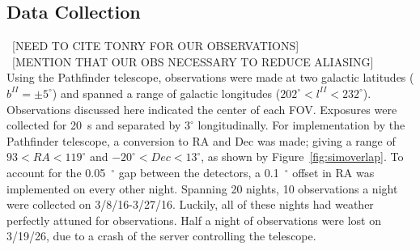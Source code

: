 \documentclass[aps,prb,twocolumn,superscriptaddress]{revtex4-1}
\begin{document}
\subsection{Data Collection}\label{sec:data}

~[NEED TO CITE TONRY FOR OUR OBSERVATIONS]\\
~[MENTION THAT OUR OBS NECESSARY TO REDUCE ALIASING]\\

Using the Pathfinder telescope, observations were made at two galactic latitudes ($b^{II}=\pm5^{\circ}$) and spanned a range of galactic longitudes ($202^{\circ} < l^{II} < 232^{\circ}$).  Observations discussed here indicated the center of each FOV.  
Exposures were collected for 20~s and separated by $3^{\circ}$ longitudinally.  For implementation by the Pathfinder telescope, a conversion to RA and Dec was made; giving a range of $93 < RA < 119^{\circ}$ and $-20^{\circ} < Dec < 13^{\circ}$, as shown by Figure~\ref{fig:simoverlap}.  To account for the 0.05~$^{\circ}$ gap between the detectors, a 0.1~$^{\circ}$ offset in RA was implemented on every other night.  
Spanning 20 nights, 10 observations a night were collected on 3/8/16-3/27/16.  Luckily, all of these nights had weather perfectly attuned for observations.  Half a night of observations were lost on 3/19/26, due to a crash of the server controlling the telescope.
\end{document}

